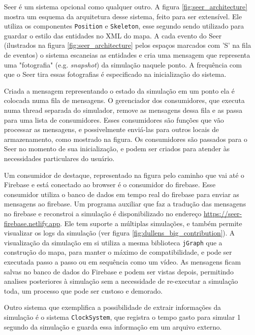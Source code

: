 Seer é um sistema opcional como qualquer outro. A figura \ref{fig:seer_architecture} mostra um esquema da arquitetura desse sistema, feito para ser extensível. Ele utiliza os componentes \texttt{Position} e \texttt{Skeleton}, esse segundo sendo utilizado para guardar o estilo das entidades no XML do mapa. A cada evento do Seer (ilustrados na figura \ref{fig:seer_architecture} pelos espaços marcados com 'S' na fila de eventos) o sistema escaneias as entidades e cria uma mensagem que representa uma "fotografia" (e.g. \textit{snapshot}) da simulação naquele ponto. A frequência com que o Seer tira essas fotografias é especificado na inicialização do sistema. 

Criada a mensagem representando o estado da simulação em um ponto ela é colocada numa fila de mensagens. O gerenciador dos consumidores, que executa numa thread separada do simulador, remove as mensagens dessa fila e as passa para uma lista de consumidores. Esses consumidores são funções que vão processar as mensagens, e possivelmente enviá-las para outros locais de armazenamento, como mostrado na figura. Os consumidores são passados para o Seer no momento de sua inicialização, e podem ser criados para atender às necessidades particulares do usuário. 

Um consumidor de destaque, representado na figura pelo caminho que vai até o Firebase e está conectado ao browser é o consumidor do firebase. Esse consumidor utiliza o banco de dados em tempo real do firebase para enviar as mensagens ao firebase. Um programa auxiliar que faz a tradução das mensagens no firebase e reconstroi a simulação é disponibilizado no endereço \url{https://seer-firebase.netlify.app}. Ele tem suporte a múltiplas simulações, e também permite visualizar os logs da simulação (ver figura \ref{fig:dullens_big_contribution}). A visualização da simulação em si utiliza a mesma biblioteca \texttt{jGraph} que a construção do mapa, para manter o máximo de compatibilidade, e pode ser executada passo a passo ou em sequência como um vídeo. As mensagens ficam salvas no banco de dados do Firebase e podem ser vistas depois, permitindo analises posteriores à simulação sem a necessidade de re-executar a simulação toda, um processo que pode ser custoso e demorado. 

Outro sistema que exemplifica a possibilidade de extrair informações da simulação é o sistema \texttt{ClockSystem}, que registra o tempo gasto para simular 1 segundo da simulação e guarda essa informação em um arquivo externo.

